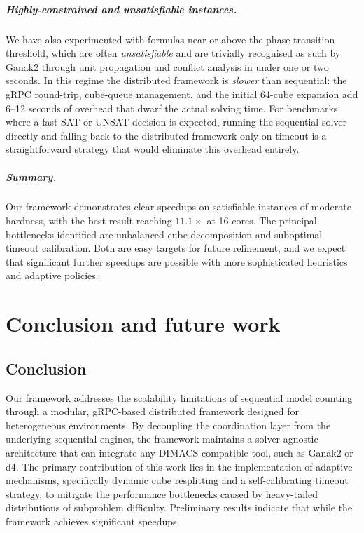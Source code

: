 \documentclass{report}
\begin{document}
\paragraph{Highly-constrained and unsatisfiable instances.} \label{para:unsat}
We have also experimented with formulas near or above the phase-transition threshold, which are often
\emph{unsatisfiable} and are trivially recognised as such by Ganak2
through unit propagation and conflict analysis in under one or two seconds.
In this regime the distributed framework is \emph{slower} than sequential:
the gRPC round-trip, cube-queue management, and the initial 64-cube expansion
add 6–12 seconds of overhead that dwarf the actual solving time.
For benchmarks where a fast SAT or UNSAT decision is expected,
running the sequential solver directly and falling back to the distributed
framework only on timeout is a straightforward strategy that would eliminate
this overhead entirely.

\paragraph{Summary.}
Our framework demonstrates clear speedups on satisfiable instances of moderate
hardness, with the best result reaching $11.1\times$ at 16 cores.
The principal bottlenecks identified are unbalanced cube decomposition and
suboptimal timeout calibration.
Both are easy targets for future refinement, and we expect that 
significant further speedups are possible with more sophisticated heuristics and adaptive policies.
   
\chapter{Conclusion and future work}
\section{Conclusion}
\vspace{-1.5em}
Our framework addresses the scalability limitations of sequential model counting through a modular, 
gRPC-based distributed framework designed for heterogeneous environments. 
By decoupling the coordination layer from the underlying sequential engines, 
the framework maintains a solver-agnostic architecture that can integrate any DIMACS-compatible tool, 
such as Ganak2 or d4. The primary contribution of this work lies in the implementation of adaptive mechanisms, 
specifically dynamic cube resplitting and a self-calibrating timeout strategy, 
to mitigate the performance bottlenecks caused by heavy-tailed distributions of subproblem difficulty. 
Preliminary results indicate that while the framework achieves significant speedups.
\vspace{-1.5em}
\end{document}
